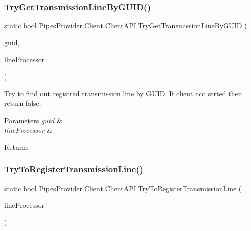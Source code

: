 \subsubsection{\texorpdfstring{Try\+Get\+Transmission\+Line\+By\+G\+U\+I\+D()}{TryGetTransmissionLineByGUID()}}
{\footnotesize\ttfamily static bool Pipes\+Provider.\+Client.\+Client\+A\+P\+I.\+Try\+Get\+Transmission\+Line\+By\+G\+U\+ID (\begin{DoxyParamCaption}\item[{string}]{guid,  }\item[{out \mbox{\hyperlink{class_pipes_provider_1_1_client_1_1_transmission_line}{Transmission\+Line}}}]{line\+Processor }\end{DoxyParamCaption})\hspace{0.3cm}{\ttfamily [static]}}



Try to find out registred transmission line by G\+U\+ID. If client not strted then return false. 


\begin{DoxyParams}{Parameters}
{\em guid} & \\
\hline
{\em line\+Processor} & \\
\hline
\end{DoxyParams}
\begin{DoxyReturn}{Returns}

\end{DoxyReturn}
\mbox{\label{class_pipes_provider_1_1_client_1_1_client_a_p_i_a70ffe69963e762ee828887856e119883}} 
\subsubsection{\texorpdfstring{Try\+To\+Register\+Transmission\+Line()}{TryToRegisterTransmissionLine()}}
{\footnotesize\ttfamily static bool Pipes\+Provider.\+Client.\+Client\+A\+P\+I.\+Try\+To\+Register\+Transmission\+Line (\begin{DoxyParamCaption}\item[{\mbox{\hyperlink{class_pipes_provider_1_1_client_1_1_transmission_line}{Transmission\+Line}}}]{line\+Processor }\end{DoxyParamCaption})\hspace{0.3cm}{\ttfamily [static]}}



